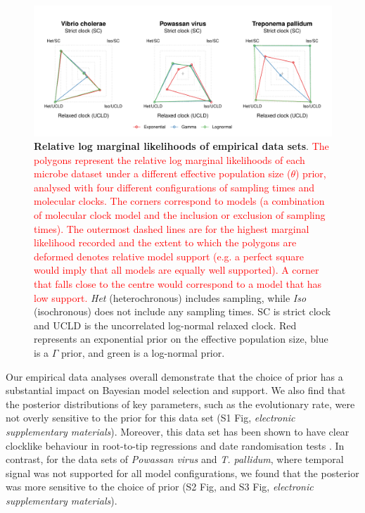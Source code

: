 \documentclass[10pt,letterpaper]{article}
\begin{document}
\begin{figure}
	\begin{center}
		\includegraphics[width=14cm]{sandbox_figures/figure_1.pdf}\newline
		\vspace{-0.5cm}
		\caption{\textbf{Relative log marginal likelihoods of empirical data sets}. \textcolor{red}{The polygons represent the relative log marginal likelihoods of each microbe dataset under a different effective population size ($\theta$) prior, analysed with four different configurations of sampling times and molecular clocks. The corners correspond to models (a combination of molecular clock model and the inclusion or exclusion of sampling times). The outermost dashed lines are for the highest marginal likelihood recorded and the extent to which the polygons are deformed denotes relative model support (e.g. a perfect square would imply that all models are equally well supported). A corner that falls close to the centre would correspond to a model that has low support.} \textit{Het} (heterochronous) includes sampling, while \textit{Iso} (isochronous) does not include any sampling times. SC is strict clock and UCLD is the uncorrelated log-normal relaxed clock. Red represents an exponential prior on the effective population size, blue is a $\Gamma$ prior, and green is a log-normal prior.}
		\label{figure:polygon_plots}
	\end{center}
\end{figure}

Our empirical data analyses overall demonstrate that the choice of prior has a substantial impact on Bayesian model selection and support. We also find that the posterior distributions of key parameters, such as the evolutionary rate, were not overly sensitive to the prior for this data set (S1 Fig, \textit{electronic supplementary materials}). Moreover, this data set has been shown to have clear clocklike behaviour in root-to-tip regressions and date randomisation tests \cite{duchene2016genome}. In contrast, for the data sets of \textit{Powassan virus} and \textit{T. pallidum}, where temporal signal was not supported for all model configurations, we found that the posterior was more sensitive to the choice of prior (S2 Fig, and S3 Fig, \textit{electronic supplementary materials}).
\end{document}

